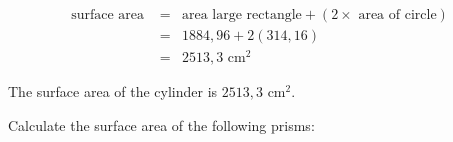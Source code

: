 \begin{wex}
{\begin{equation*}
\begin{array}{rcl}
 \mbox{surface area }&=& \mbox{area large rectangle}  + (2\times \mbox{  area of circle})\\
&=& 1884,96 + 2(314,16) \\
&=&2513,3\mbox{ cm}^2
\end{array}
\end{equation*}

The surface area of the cylinder is $2513,3\mbox{ cm}^2$.
}
\end{wex}






\begin{exercises}{ }

Calculate the surface area of the following prisms:


\end{exercises}
